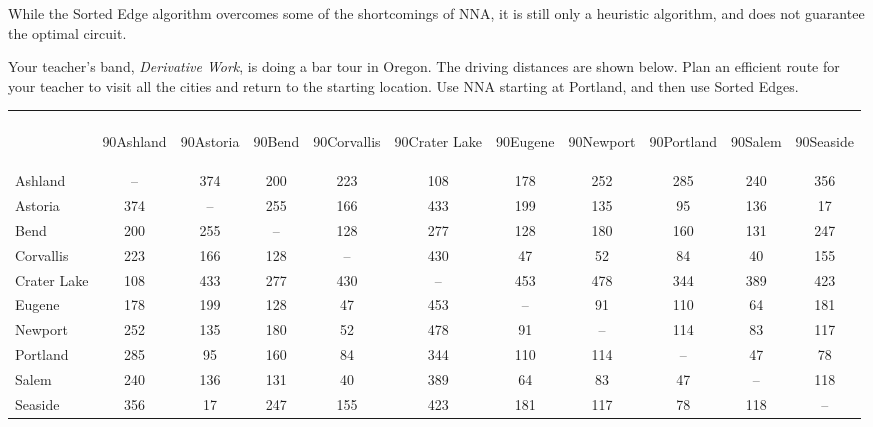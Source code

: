 While the Sorted Edge algorithm overcomes some of the shortcomings of NNA, it is still only a heuristic algorithm, and does not guarantee the optimal circuit.

\begin{example}{} %
Your teacher's band, \textit{Derivative Work}, is doing a bar tour in Oregon.  The driving distances are shown below.  Plan an efficient route for your teacher to visit all the cities and return to the starting location.  Use NNA starting at Portland, and then use Sorted Edges.
\begin{center}
\begin{tabular}{|l|c|c|c|c|c|c|c|c|c|c|}
\hline
&&&&&&&&&&\\[7ex]
& \begin{rotate}{90}Ashland \end{rotate}& \begin{rotate}{90}Astoria\end{rotate}  & \begin{rotate}{90}Bend \end{rotate}& \begin{rotate}{90}Corvallis \end{rotate} & \begin{rotate}{90}Crater Lake \end{rotate} &  \begin{rotate}{90}Eugene  \end{rotate}&  \begin{rotate}{90}Newport \end{rotate} &  \begin{rotate}{90}Portland  \end{rotate}& \begin{rotate}{90}Salem \end{rotate} &  \begin{rotate}{90}Seaside \end{rotate}\\
\hline
Ashland & --&374&200&223&108&178&252&285&240&356\\
\hline
Astoria & 374&--&255&166&433&199&135&95&136&17\\
\hline
Bend & 200 & 255 &--&128&277&128&180 & 160&131&247\\
\hline
Corvallis&223&166&128&--&430&47&52&84&40&155\\
\hline
Crater Lake &108&433&277&430&--&453&478&344&389&423\\
\hline
Eugene &178&199&128&47&453&--&91&110&64&181\\
\hline
Newport&252&135&180&52&478&91&--&114&83&117\\
\hline
Portland &285&95&160&84&344&110&114&--&47&78\\
\hline
Salem & 240 &136&131&40&389&64&83&47&--&118\\
\hline
Seaside&356&17&247&155&423&181&117&78&118&--\\
\hline
\end{tabular}
\end{center}


\end{example}

